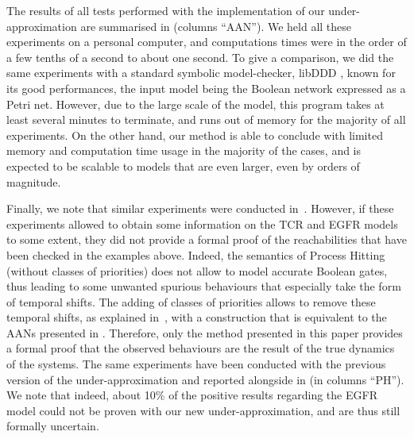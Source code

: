 The results of all tests performed with the implementation of our under-approximation
are summarised in  (columns “AAN”).
We held all these experiments on a personal computer,
and computations times were in the order of a few tenths of a second to about one second.
To give a comparison, we did the same experiments with a standard symbolic model-checker, libDDD
\cite{libddd}, known for its good performances, the input model being the Boolean network expressed
as a Petri net.
However, due to the large scale of the model,
this program takes at least several minutes to terminate,
and runs out of memory for the majority of all experiments.
On the other hand,
our method is able to conclude with limited memory and computation time usage
in the majority of the cases,
and is expected to be scalable to models that are even larger,
even by orders of magnitude.

Finally, we note that similar experiments were conducted in~\cite{PMR12-MSCS}.
However, if these experiments allowed to obtain some information
on the TCR and EGFR models to some extent,
they did not provide a formal proof of the reachabilities that have been
checked in the examples above.
Indeed, the semantics of Process Hitting (without classes of priorities)
does not allow to model accurate Boolean gates,
thus leading to some unwanted spurious behaviours
that especially take the form of temporal shifts.
The adding of classes of priorities allows to remove these temporal shifts,
as explained in~\cite{FPMR13-CS2Bio},
with a construction that is equivalent to the AANs presented in .
Therefore, only the method presented in this paper provides a formal proof that
the observed behaviours are the result of the true dynamics of the systems.
The same experiments have been conducted with the previous version
of the under-approximation and reported alongside in 
(in columns “PH”).
We note that indeed, about 10\% of the positive results regarding the EGFR model
could not be proven with our new under-approximation,
and are thus still formally uncertain.

\newcommand{\grcl}{\cellcolor{lightgraycell}}

